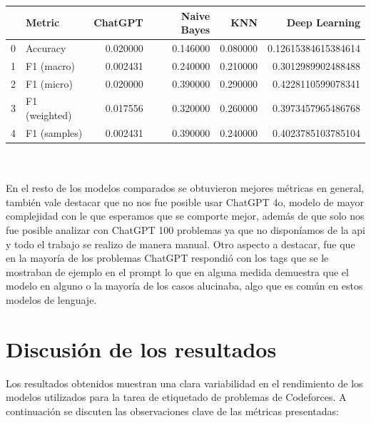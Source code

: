 \documentclass{article}
\begin{document}
\begin{tabular}{|l|l|r|r|r|r|}
    \toprule
    {} & Metric        & ChatGPT  & Naive Bayes & KNN      & Deep Learning       \\
    \midrule
    0  & Accuracy      & 0.020000 & 0.146000    & 0.080000 & 0.12615384615384614 \\
    1  & F1 (macro)    & 0.002431 & 0.240000    & 0.210000 & 0.3012989902488488  \\
    2  & F1 (micro)    & 0.020000 & 0.390000    & 0.290000 & 0.4228110599078341  \\
    3  & F1 (weighted) & 0.017556 & 0.320000    & 0.260000 & 0.3973457965486768  \\
    4  & F1 (samples)  & 0.002431 & 0.390000    & 0.240000 & 0.4023785103785104  \\
    \bottomrule
\end{tabular}\\\\

En el resto de los modelos comparados se obtuvieron mejores métricas en general, también vale destacar que no nos fue posible
usar ChatGPT 4o, modelo de mayor complejidad con le que esperamos que se comporte mejor, además de que solo nos fue posible 
analizar con ChatGPT 100 problemas ya que no disponíamos de la api y todo el trabajo se realizo de manera manual. Otro aspecto
a destacar, fue que en la mayoría de los problemas ChatGPT respondió  con los tags que se le mostraban de ejemplo en el prompt
lo que en alguna medida demuestra que el modelo en alguno o la mayoría de los casos alucinaba, algo que es común en estos modelos 
de lenguaje.

\section{Discusión de los resultados}
Los resultados obtenidos muestran una clara variabilidad en el rendimiento de los modelos utilizados para la tarea de etiquetado de problemas de Codeforces. A continuación se discuten las observaciones clave de las métricas presentadas:
\end{document}

